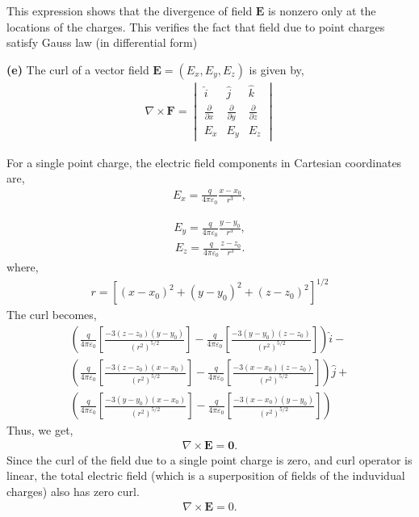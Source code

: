 \documentclass{article}
\begin{document}
This expression shows that the divergence of field $\mathbf{E}$ is nonzero only at the locations of the charges. This verifies the fact that field due to point charges satisfy Gauss law (in differential form) 

\textbf{(e)} The curl of a vector field $\mathbf{E} = (E_x, E_y, E_z)$ is given by,
\begin{align*}
\nabla \times \mathbf{F} = \begin{vmatrix}
\hat{i} & \hat{j} & \hat{k} \\
\frac{\partial}{\partial x} & \frac{\partial}{\partial y} & \frac{\partial}{\partial z} \\
E_x & E_y & E_z
\end{vmatrix}
\end{align*}

For a single point charge, the electric field components in Cartesian coordinates are,
\begin{align*}
    E_x = \frac{q}{4\pi\varepsilon_0} \frac{x - x_0}{r^3},
\end{align*}

\begin{align*}
    E_y = \frac{q}{4\pi\varepsilon_0} \frac{y - y_0}{r^3},
\end{align*}
\begin{align*}
    E_z = \frac{q}{4\pi\varepsilon_0} \frac{z - z_0}{r^3}.
\end{align*}
where, 
\begin{align*}
    r = [(x - x_0)^2 + (y - y_0)^2 + (z - z_0)^2]^{1/2}
\end{align*}
The curl becomes,
\begin{align*}
    \left( \frac{q}{4\pi\varepsilon_0} \left[ \frac{-3(z - z_0)(y - y_0)}{(r^2)^{5/2}} \right] - \frac{q}{4\pi\varepsilon_0} \left[ \frac{-3(y - y_0)(z - z_0)}{(r^2)^{5/2}} \right] \right)\hat{i } - \\
    \left( \frac{q}{4\pi\varepsilon_0} \left[ \frac{-3(z - z_0)(x - x_0)}{(r^2)^{5/2}} \right] -  \frac{q}{4\pi\varepsilon_0} \left[ \frac{-3(x - x_0)(z - z_0)}{(r^2)^{5/2}} \right]  \right)\hat{j} + \\
    \left( \frac{q}{4\pi\varepsilon_0} \left[ \frac{-3(y - y_0)(x - x_0)}{(r^2)^{5/2}} \right] - \frac{q}{4\pi\varepsilon_0} \left[ \frac{-3(x - x_0)(y - y_0)}{(r^2)^{5/2}} \right]  \right)
\end{align*}
Thus, we get,
\begin{align*}
    \nabla \times \mathbf{E} = \mathbf{0}.
\end{align*}
Since the curl of the field due to a single point charge is zero, and curl operator is linear, the total electric field (which is a superposition of fields of the induvidual charges) also has zero curl.
\begin{align*}
    \nabla \times \mathbf{E} = 0.
\end{align*}
\end{document}
